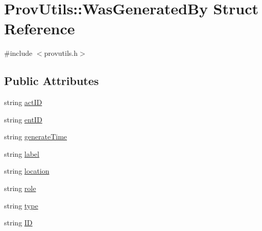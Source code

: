\hypertarget{struct_prov_utils_1_1_was_generated_by}{\section{Prov\-Utils\-:\-:Was\-Generated\-By Struct Reference}
\label{struct_prov_utils_1_1_was_generated_by}
}


{\ttfamily \#include $<$provutils.\-h$>$}

\subsection*{Public Attributes}
\begin{DoxyCompactItemize}
\item 
string \hyperlink{struct_prov_utils_1_1_was_generated_by_a0fdc1d899eaf8eae7db216a566315886}{act\-I\-D}
\item 
string \hyperlink{struct_prov_utils_1_1_was_generated_by_a8d29264ea8f2842169d5fdf269924d5b}{ent\-I\-D}
\item 
string \hyperlink{struct_prov_utils_1_1_was_generated_by_a206ec37f55ac4258a4114ae2778ab09b}{generate\-Time}
\item 
string \hyperlink{struct_prov_utils_1_1_was_generated_by_a9f6b81f45912688abbf99d928e7d8e8f}{label}
\item 
string \hyperlink{struct_prov_utils_1_1_was_generated_by_a13dc655caf70af358f6971e430367995}{location}
\item 
string \hyperlink{struct_prov_utils_1_1_was_generated_by_a2e51f173fa9aaa64cb2b98b4246e85fb}{role}
\item 
string \hyperlink{struct_prov_utils_1_1_was_generated_by_a7a9540ee8718a4dfe0ff9a6f877e4ce5}{type}
\item 
string \hyperlink{struct_prov_utils_1_1_was_generated_by_a40485fa84deb9d598c3aac5cfd576b96}{I\-D}
\end{DoxyCompactItemize}


